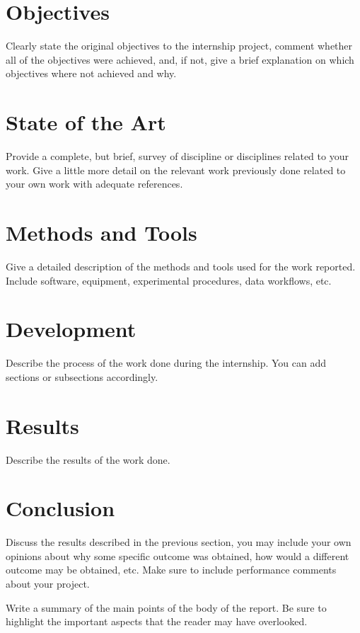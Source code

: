 \documentclass[peerreviewca]{IEEEtran}
\begin{document}
\section{Objectives}
Clearly state the original objectives to the internship project, comment whether all of
the objectives were achieved, and, if not, give a brief explanation on which
objectives where not achieved and why.


\section{State of the Art}
Provide a complete, but brief, survey of discipline or disciplines related to your
work. Give a little more detail on the relevant work previously done related to
your own work with adequate references.

\section{Methods and Tools}
Give a detailed description of the methods and tools used for the work
reported. Include software, equipment, experimental procedures, data workflows,
etc.

\section{Development}
Describe the process of the work done during the internship. You can add
sections or subsections accordingly.

\section{Results}
Describe the results of the work done.

\section{Conclusion}
Discuss the results described in the previous section, you may include your own
opinions about why some specific outcome was obtained, how would a different
outcome may be obtained, etc. Make sure to include performance comments about your project.

Write a summary of the main points of the body of the report. Be sure to
highlight the important aspects that the reader may have overlooked. 





\end{document}
